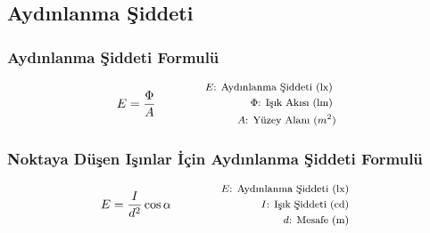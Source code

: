 \subsection{Aydınlanma Şiddeti}

\subsubsection*{Aydınlanma Şiddeti Formulü}
\begin{equation}
    E = \frac{\Phi}{A} \qquad \qquad \parbox{4cm}{\footnotesize$\begin{aligned}
        E\text{: Aydınlanma Şiddeti (lx) } \\
        \Phi\text{: Işık Akısı (lm) } \\
        A\text{: Yüzey Alanı } (m^2)
\end{aligned}$}
\end{equation}

\begin{figure}[h!]
    \centering
\end{figure}

\subsubsection*{Noktaya Düşen Işınlar İçin Aydınlanma Şiddeti Formulü}
\begin{equation}
    E = \frac{I}{d^2} \cos{\alpha} \qquad \qquad \parbox{4cm}{\footnotesize$\begin{aligned}
        E\text{: Aydınlanma Şiddeti (lx) } \\
        I\text{: Işık Şiddeti (cd) } \\
        d\text{: Mesafe (m) } 
\end{aligned}$}
\end{equation}
